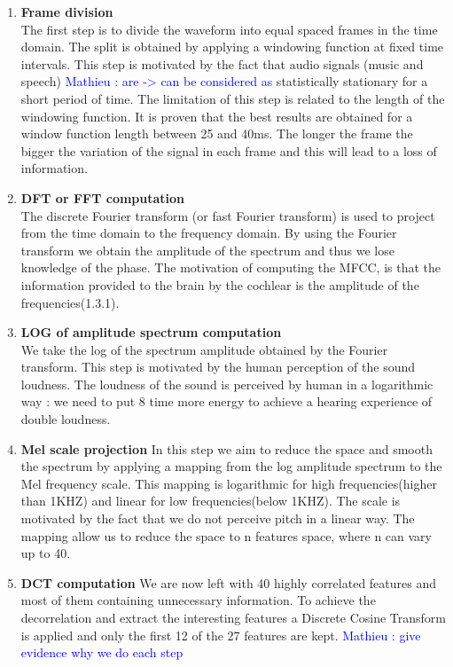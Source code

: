\documentclass[hidelinks,12pt]{report}
\newcommand{\ml}[1]{\textcolor{blue}{ Mathieu : #1}}
\begin{document}
\begin{enumerate}
\item \textbf{Frame division} \\
The first step is to divide the waveform into equal spaced frames in the time domain. The split is obtained by applying a windowing function at fixed time intervals. This step is motivated by the fact that audio signals (music and speech) \ml{are -> can be considered as} statistically stationary for a short period of time. The limitation of this step is related to the length of the windowing function. It is proven that the best results are obtained for a window function length between 25 and 40ms. The longer the frame the bigger the variation of the signal in each frame and this will lead to a loss of information. 

\item \textbf{DFT or FFT computation\\}
The discrete Fourier transform (or fast Fourier transform) is used to project from the time domain to the frequency domain. By using the Fourier transform we obtain the amplitude of the spectrum and thus we lose knowledge of the phase. The motivation of computing the MFCC, is that the information provided to the brain by the cochlear is the amplitude of the frequencies(1.3.1).
\item \textbf{LOG of amplitude spectrum computation}\\
We take the log of the spectrum amplitude obtained by the Fourier transform. This step is motivated by the human perception of the sound loudness. The loudness of the sound is perceived by human in a logarithmic way : we need to put 8 time more energy to achieve a hearing experience of double loudness. 
\item \textbf{Mel scale projection}
In this step we aim to reduce the space and smooth the spectrum by applying a mapping from the log amplitude spectrum to the Mel frequency scale. This mapping is logarithmic for high frequencies(higher than 1KHZ) and linear for low frequencies(below 1KHZ). The scale is motivated by the fact that we do not perceive pitch in a linear way. The mapping allow us to reduce the space to n features space, where n can vary up to 40.
\item \textbf{DCT computation}
We are now left with 40 highly correlated features and most of them containing unnecessary information. To achieve the decorrelation and extract the interesting features a Discrete Cosine Transform is applied and only the first 12 of the 27 features are kept. \ml{give evidence why we do each step}
\end{enumerate}
\end{document}
